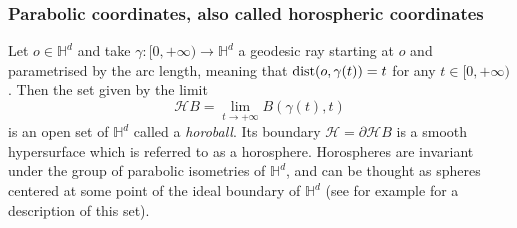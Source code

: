 \documentclass[12pt,longbibliography]{article}
\def\d{\,\mathrm{d}}
\def\d{\,\mathrm{d}}
\theoremstyle{definition}
\theoremstyle{remark}
\theoremstyle{example}
\begin{document}
%


\subsubsection{Parabolic coordinates, also called horospheric coordinates}\label{sect:horospheric_coordinates}

Let $o \in \mathbb{H}^d$ and take $\gamma : [0, +\infty) \to \mathbb{H}^d$ a geodesic ray starting at $o$ and parametrised  by the arc length, meaning that $\textup{dist} (o, \gamma (t)) =t$ for any $t \in [0,+\infty)$. Then the set given by the limit
\[
\mathcal{H}B = \displaystyle\lim_{t \to +\infty} B(\gamma (t), t)
\]
is an open set of $\mathbb{H}^d$ called a \textit{horoball}. Its boundary $\mathcal{H} = \partial \mathcal{H}B$ is a smooth hypersurface which is referred to as a horosphere. Horospheres are invariant under the group of parabolic isometries of $\mathbb{H}^d$, and can be thought as spheres centered at some point of the ideal boundary of $\mathbb{H}^d$ (see for example \cite{petersen2016riemannian} for a description of this set).
\end{document}

